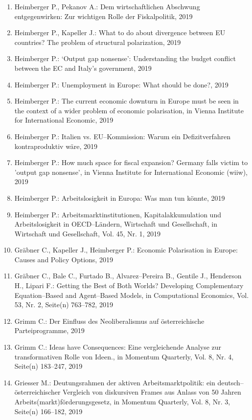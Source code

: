 \begin{enumerate}
	 \item Heimberger P., Pekanov A.: Dem wirtschaftlichen Abschwung entgegenwirken: Zur wichtigen Rolle der Fiskalpolitik, 2019
	 \item Heimberger P., Kapeller J.: What to do about divergence between EU countries? The problem of structural polarization, 2019
	 \item Heimberger P.: ‘Output gap nonsense': Understanding the budget conflict between the EC and Italy’s government, 2019
	 \item Heimberger P.: Unemployment in Europe: What should be done?, 2019
	 \item Heimberger P.: The current economic downturn in Europe must be seen in the context of a wider problem of economic polarisation, in Vienna Institute for International Economic, 2019
	 \item Heimberger P.: Italien vs. EU--Kommission: Warum ein Defizitverfahren kontraproduktiv wäre, 2019
	 \item Heimberger P.: How much space for fiscal expansion? Germany falls victim to 'output gap nonsense’, in Vienna Institute for International Economic (wiiw), 2019
	 \item Heimberger P.: Arbeitslosigkeit in Europa: Was man tun könnte, 2019
	 \item Heimberger P.: Arbeitsmarktinstitutionen, Kapitalakkumulation und Arbeitslosigkeit in OECD--Ländern, Wirtschaft und Gesellschaft, in Wirtschaft und Gesellschaft, Vol. 45, Nr. 1, 2019
	 \item Gräbner C., Kapeller J., Heimberger P.: Economic Polarisation in Europe: Causes and Policy Options, 2019
	 \item Gräbner C., Bale C., Furtado B., Alvarez--Pereira B., Gentile J., Henderson H., Lipari F.: Getting the Best of Both Worlds? Developing Complementary Equation--Based and Agent--Based Models, in Computational Economics, Vol. 53, Nr. 2, Seite(n) 763--782, 2019
	 \item Grimm C.: Der Einfluss des Neoliberalismus auf österreichische Parteiprogramme, 2019
	 \item Grimm C.: Ideas have Consequences: Eine vergleichende Analyse zur transformativen Rolle von Ideen., in Momentum Quarterly, Vol. 8, Nr. 4, Seite(n) 183--247, 2019
	 \item Griesser M.: Deutungsrahmen der aktiven Arbeitsmarktpolitik: ein deutsch--österreichischer Vergleich von diskursiven Frames aus Anlass von 50 Jahren Arbeits(markt)förderungsgesetz, in Momentum Quarterly, Vol. 8, Nr. 3, Seite(n) 166--182, 2019

\end{enumerate}

